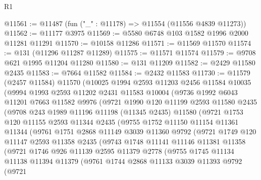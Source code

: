 \begin{lexlean}{R1}
\begin{coremodule}
@11561 := @11487 (fun ("_" : @11178) => @11554 (@11556 @4839 @11273))
@11562 := @11177 @3975
@11569 := @5580 @6748 @103 @1582 @1996 @2000 @11281 @11291
@11570 := @10158 @11286
@11571 := @11569 @11570
@11574 := @131 (@11296 @11287 @11289)
@11575 := @11571 @11574
@11579 := @9708 @621 @1995 @11204 @11280
@11580 := @131 @11209
@11582 := @2429 @11580 @2435
@11583 := @7664 @11582
@11584 := @2432 @11583
@11730 := @11579
    (@2457 @11584)
    @11570
    (@10025
      @1994
      @2593
      @11203
      @2456
      @11584
      @10035
      (@9994
        @1993
        @2593
        @11202
        @2431
        @11583
        @10004
        (@9736
          @1992
          @6043
          @11201
          @7663
          @11582
          @9976
          (@9721
            @1990
            @120
            @11199
            @2593
            @11580
            @2435
            (@9708
              @243
              @1989
              @11196
              @11198
              (@11345 @2435)
              @11580
              (@9721
                @1753
                @120
                @11155
                @2593
                @11344
                @2435
                (@9755
                  @1752
                  @11150
                  @11154
                  @11361
                  @11344
                  (@9761
                    @1751
                    @2868
                    @11149
                    @3039
                    @11360
                    @9792
                    (@9721
                      @1749
                      @120
                      @11147
                      @2593
                      @11358
                      @2435
                      (@9743
                        @1748
                        @11141
                        @11146
                        @11381
                        @11358
                        (@9721
                          @1746
                          @926
                          @11139
                          @2595
                          @11379
                          @2778
                          (@9755
                            @1745
                            @11134
                            @11138
                            @11394
                            @11379
                            (@9761
                              @1744
                              @2868
                              @11133
                              @3039
                              @11393
                              @9792
                              (@9721

\end{coremodule}
\end{lexlean}
